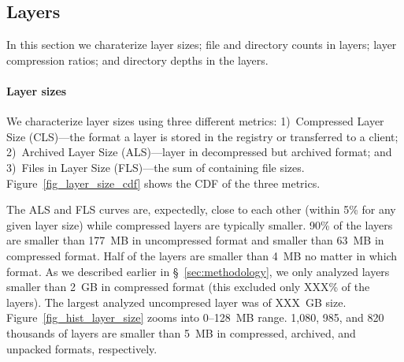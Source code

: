\subsection{Layers}
\label{sec:layers}
In this section we charaterize layer sizes; file and directory counts in
layers; layer compression ratios; and directory depths in the layers.




\paragraph{Layer sizes}
%
We characterize layer sizes using three different metrics:
%
1)~Compressed Layer Size (CLS)---the format a layer is stored in the registry or
transferred to a client;
%
2)~Archived Layer Size (ALS)---layer in decompressed but archived format;
%
and 3)~Files in Layer Size (FLS)---the sum of containing file sizes.
%
Figure~\ref{fig_layer_size_cdf} shows the CDF of the three metrics.

The ALS and FLS curves are, expectedly, close to each other (within 5\% for
any given layer size) while compressed layers are typically smaller.
90\% of the layers are smaller than 177~MB in uncompressed 
format and smaller than 63~MB in compressed format.
%
Half of the layers are smaller than 4~MB no matter in which format.
%
As we described earlier in \S~\ref{sec:methodology}, we only
analyzed layers smaller than 2~GB in compressed format (this
excluded only XXX\% of the layers).
%
%
The largest analyzed uncompresed layer
was of XXX~GB size.
%
Figure~\ref{fig_hist_layer_size} zooms into 0--128~MB range.
%
1,080, 985, and 820 thousands of layers are smaller than 5~MB
in compressed, archived, and unpacked formats, respectively.
%





